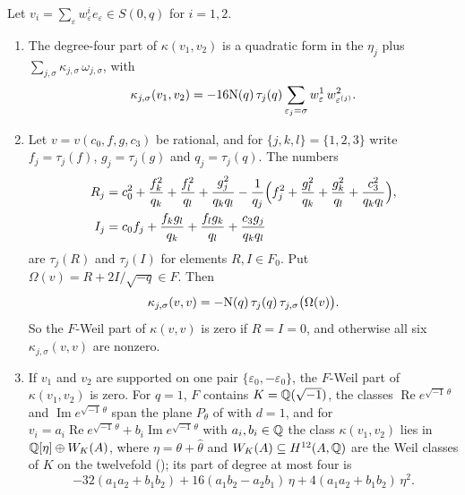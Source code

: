 \begin{lemma}\label{lem:sexticweil}
Let $v_{i}=\sum_{\varepsilon}w^{i}_{\varepsilon}e_{\varepsilon}\in S(0,q)$ for
$i=1,2$.
\begin{enumerate}[label=\textup{(\roman*)},leftmargin=2.6em,itemsep=2pt]
\item The degree-four part of $\kappa(v_{1},v_{2})$ is a quadratic form in the
  $\eta_{j}$ plus $\sum_{j,\sigma}\kappa_{j,\sigma}\,\omega_{j,\sigma}$, with
  \[
    \kappa_{j,\sigma}(v_{1},v_{2})=-16\mathrm{N}(q)\,\tau_{j}(q)
    \sum_{\varepsilon_{j}=\sigma}w^{1}_{\varepsilon}\,w^{2}_{\varepsilon^{(j)}}.
  \]
\item Let $v=v(c_{0},f,g,c_{3})$ be rational, and for $\{j,k,l\}=\{1,2,3\}$
  write $f_{j}=\tau_{j}(f)$, $g_{j}=\tau_{j}(g)$ and $q_{j}=\tau_{j}(q)$. The
  numbers
  \begin{align*}
    R_{j}&=c_{0}^{2}+\frac{f_{k}^{2}}{q_{k}}+\frac{f_{l}^{2}}{q_{l}}
      +\frac{g_{j}^{2}}{q_{k}q_{l}}-\frac{1}{q_{j}}\Bigl(f_{j}^{2}
      +\frac{g_{l}^{2}}{q_{k}}+\frac{g_{k}^{2}}{q_{l}}
      +\frac{c_{3}^{2}}{q_{k}q_{l}}\Bigr),\\
    I_{j}&=c_{0}f_{j}+\frac{f_{k}g_{l}}{q_{k}}+\frac{f_{l}g_{k}}{q_{l}}
      +\frac{c_{3}g_{j}}{q_{k}q_{l}}
  \end{align*}
  are $\tau_{j}(R)$ and $\tau_{j}(I)$ for elements $R,I\in F_{0}$. Put
  $\Omega(v)=R+2I/\sqrt{-q}\in F$. Then
  \[
    \kappa_{j,\sigma}(v,v)=-\mathrm{N}(q)\,\tau_{j}(q)\,\tau_{j,\sigma}\bigl(\Omega(v)\bigr).
  \]
  So the $F$-Weil part of $\kappa(v,v)$ is zero if $R=I=0$, and otherwise
  all six $\kappa_{j,\sigma}(v,v)$ are nonzero.
\item If $v_{1}$ and $v_{2}$ are supported on one pair
  $\{\varepsilon_{0},-\varepsilon_{0}\}$, the $F$-Weil part of
  $\kappa(v_{1},v_{2})$ is zero. For $q=1$, $F$ contains
  $K=\mathbb{Q}(\sqrt{-1})$, the classes $\operatorname{Re}e^{\sqrt{-1}\,\theta}$ and
  $\operatorname{Im}e^{\sqrt{-1}\,\theta}$ span the plane $P_{\theta}$ of
  \cite[Definition~14.4]{paperI} with $d=1$, and for
  $v_{i}=a_{i}\operatorname{Re}e^{\sqrt{-1}\,\theta}
  +b_{i}\operatorname{Im}e^{\sqrt{-1}\,\theta}$ with $a_{i},b_{i}\in\mathbb{Q}$ the
  class $\kappa(v_{1},v_{2})$ lies in $\mathbb{Q}[\eta]\oplus W_{K}(A)$, where
  $\eta=\theta+\widehat\theta$ and $W_{K}(A)\subseteq H^{12}(A,\mathbb{Q})$ are the
  Weil classes of $K$ on the twelvefold (\cite[Proposition~17.10]{paperI}); its part of
  degree at most four is
  \[
    -32(a_{1}a_{2}+b_{1}b_{2})+16(a_{1}b_{2}-a_{2}b_{1})\,\eta
    +4(a_{1}a_{2}+b_{1}b_{2})\,\eta^{2}.
  \]
\end{enumerate}
\end{lemma}

